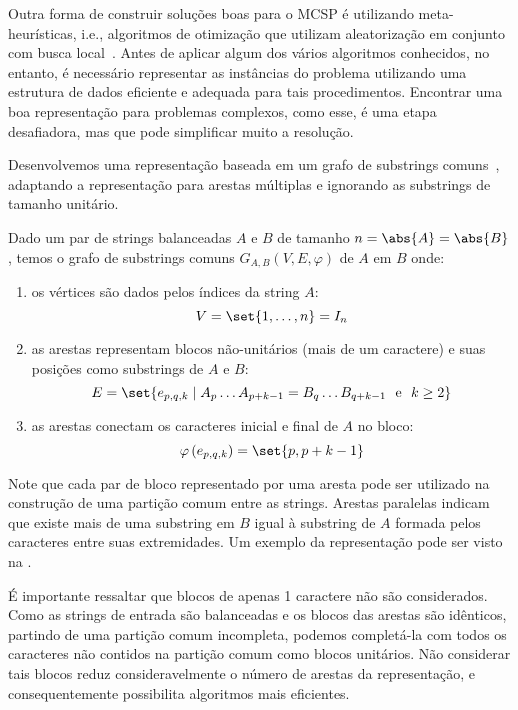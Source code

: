 Outra forma de construir soluções boas para o MCSP é utilizando meta-heurísticas, i.e., algoritmos de otimização que utilizam aleatorização em conjunto com busca local~\cite[p.~4]{yang_nature-inspired_2010}. Antes de aplicar algum dos vários algoritmos conhecidos, no entanto, é necessário representar as instâncias do problema utilizando uma estrutura de dados eficiente e adequada para tais procedimentos. Encontrar uma boa representação para problemas complexos, como esse, é uma etapa desafiadora, mas que pode simplificar muito a resolução.

Desenvolvemos uma representação baseada em um grafo de substrings comuns~\cite{ferdous_solving_2017}, adaptando a representação para arestas múltiplas e ignorando as substrings de tamanho unitário.

\begin{definition}
    Dado um par de strings balanceadas $A$ e $B$ de tamanho $n = \abs{A} = \abs{B}$, temos o grafo de substrings comuns $G_{A,B}(V,E,\varphi)$ de $A$ em $B$ onde:

    \begin{enumerate}[
        label = {\alph*)},
        ref = \thedefinition.\alph*,
        parsep = 0pt,
        itemsep = 0.2em,
        topsep = 0pt
    ]
        \item os vértices são dados pelos índices da string $A$: \[
            V = \set{1, \ldots, n} = I_n
        \]

        \item as arestas representam blocos não-unitários (mais de um caractere) e suas posições como substrings de $A$ e $B$: \[
            E = \set{e_{p, q, k} \mid A_p \ldots A_{p + k - 1} = B_q \ldots B_{q + k - 1} ~\text{ e }~ k \geq 2}
        \]

        \item as arestas conectam os caracteres inicial e final de $A$ no bloco: \[
            \varphi\left(e_{p, q, k}\right) = \set{p, p + k - 1}
        \]
    \end{enumerate}
\end{definition}

Note que cada par de bloco representado por uma aresta pode ser utilizado na construção de uma partição comum entre as strings. Arestas paralelas indicam que existe mais de uma substring em $B$ igual à substring de $A$ formada pelos caracteres entre suas extremidades. Um exemplo da representação pode ser visto na .

É importante ressaltar que blocos de apenas 1 caractere não são considerados. Como as strings de entrada são balanceadas e os blocos das arestas são idênticos, partindo de uma partição comum incompleta, podemos completá-la com todos os caracteres não contidos na partição comum como blocos unitários. Não considerar tais blocos reduz consideravelmente o número de arestas da representação, e consequentemente possibilita algoritmos mais eficientes.

